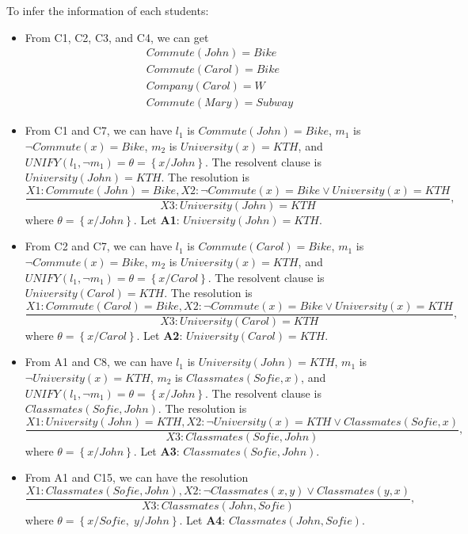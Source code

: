 \documentclass[11pt,a4paper]{article}
\begin{document}
\par To infer the information of each students:
\begin{itemize}
	\item From C1, C2, C3, and C4, we can get
	\begin{align*}
		& Commute(John) = Bike \\
		& Commute(Carol) = Bike \\
		& Company(Carol) = W \\
		& Commute(Mary) = Subway
	\end{align*}
	
	\item From C1 and C7, we can have $l_{1}$ is $Commute(John) = Bike$, $m_{1}$ is $\lnot Commute(x) = Bike$, $m_{2}$ is $University(x) = KTH$, and $UNIFY(l_{1}, \lnot m_{1}) = \theta = \left\{ x/John \right\}$. The resolvent clause is $University(John) = KTH$. The resolution is
	$$
	\frac{X1: Commute(John) = Bike, X2: \lnot Commute(x) = Bike \vee University(x) = KTH}{X3: University(John) = KTH},
	$$
	where $\theta = \left\{ x/John \right\}$. Let \textbf{A1}: $University(John) = KTH$.
	
	\item From C2 and C7, we can have $l_{1}$ is $Commute(Carol) = Bike$, $m_{1}$ is $\lnot Commute(x) = Bike$, $m_{2}$ is $University(x) = KTH$, and $UNIFY(l_{1}, \lnot m_{1}) = \theta = \left\{ x/Carol \right\}$. The resolvent clause is $University(Carol) = KTH$. The resolution is
	$$
	\frac{X1: Commute(Carol) = Bike, X2: \lnot Commute(x) = Bike \vee University(x) = KTH}{X3: University(Carol) = KTH},
	$$
	where $\theta = \left\{ x/Carol \right\}$. Let \textbf{A2}: $University(Carol) = KTH$.
	
	\item From A1 and C8, we can have $l_{1}$ is $University(John) = KTH$, $m_{1}$ is $\lnot University(x) = KTH$, $m_{2}$ is $Classmates(Sofie, x)$, and $UNIFY(l_{1}, \lnot m_{1}) = \theta = \left\{ x/John \right\}$. The resolvent clause is $Classmates(Sofie, John)$. The resolution is
	$$
	\frac{X1: University(John) = KTH, X2: \lnot University(x) = KTH \vee Classmates(Sofie, x)}{X3: Classmates(Sofie, John)},
	$$
	where $\theta = \left\{ x/John \right\}$. Let \textbf{A3}: $Classmates(Sofie, John)$.
	
	\item From A1 and C15, we can have the resolution
	$$
	\frac{X1: Classmates(Sofie, John), X2: \lnot Classmates(x, y) \vee Classmates(y, x)}{X3: Classmates(John, Sofie)},
	$$
	where $\theta = \left\{ x/Sofie, \; y/John \right\}$. Let \textbf{A4}: $Classmates(John, Sofie)$.
	

\end{itemize}
\end{document}
